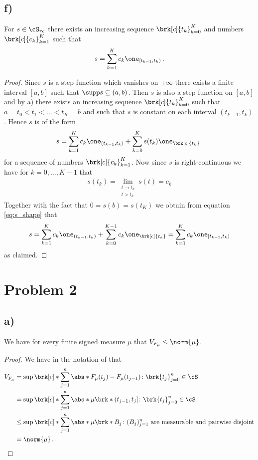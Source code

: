 \subsection{f)}
\begin{claim}
For $s\in \cS_{rc}$ there exists an increasing sequence $\brk[c]{t_k}_{k=0}^K$ and numbers  $\brk[c]{c_k}_{k=1}^K$ such that
\begin{align*}
	s = \sum_{k=1}^Kc_k\one_{[t_{k-1},t_k)}\,.
\end{align*}
\end{claim}
\begin{proof}
Since $s$ is a step function which vanishes on $\pm\infty$ there exists a finite interval $[a,b]$ such that $\supp s\subseteq(a,b)$. Then $s$ is also a step function on $[a,b]$ and by a) there exists an increasing sequence $\brk[c]{t_k}_{k=0}^K$ such that $a=t_0<t_1<\dots<t_K=b$ and such that $s$ is constant on each interval $(t_{k-1},t_k)$. Hence $s$ is of the form
\begin{align}
	s = \sum_{k=1}^Kc_k\one_{(t_{k-1},t_k)}+\sum_{k=0}^Ks(t_k)\one_{\brk[c]{t_k}}\,.\label{eq:s_shape}
\end{align}
for a sequence of numbers $\brk[c]{c_k}_{k=1}^K$. Now since $s$ is right-continuous we have for $k=0,\dots,K-1$ that
\begin{align*}
	s(t_k)=\lim_{\substack{t\to t_k\\t>t_k}}s(t)=c_k
\end{align*}
Together with the fact that $0=s(b)=s(t_K)$ we obtain from equation \ref{eq:s_shape} that
\begin{align*}
	s = \sum_{k=1}^Kc_k\one_{(t_{k-1},t_k)}+\sum_{k=0}^ {K-1}c_k\one_{\brk[c]{t_k}}
	= \sum_{k=1}^Kc_k\one_{[t_{k-1},t_k)}
\end{align*}
as claimed.
\end{proof}

\section{Problem 2}

\subsection{a)}
\begin{claim}
We have for every finite signed measure $\mu$ that $V_{F_\mu}\leq \norm{\mu}$.
\end{claim}
\begin{proof}
We have in the notation of \cite[chapter 4.4]{CohnMT} that
\begin{align*}
	V_{F_\mu}&=\sup\brk[c]*{\sum_{j=1}^n\abs*{F_\mu(t_j)-F_\mu(t_{j-1})}\colon \brk{t_j}_{j=0}^n\in\cS} \\
	&= \sup\brk[c]*{\sum_{j=1}^n\abs*{\mu\brk*{(t_{j-1},t_j]}}\colon \brk{t_j}_{j=0}^n\in\cS} \\
	&\leq \sup\brk[c]*{\sum_{j=1}^n\abs*{\mu\brk*{B_j}}\colon (B_j)_{j=1}^n\text{ are measurable and pairwise disjoint}} \\
	&=\norm{\mu}\,.
\end{align*}
\end{proof}

